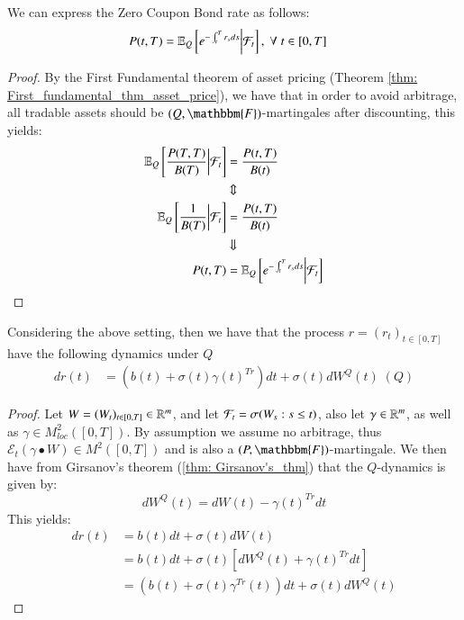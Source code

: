 \begin{result} 
We can express the Zero Coupon Bond rate as follows:
\begin{align*}
P(t,T) &= \mathbb{E}_{Q}\left[
e^{-\int_{t}^{T}r_{s}ds}\bigg{|}\mathcal{F}_{t}
\right], \;\forall \; t\in[0,T]
\end{align*}
\end{result}

\begin{proof}
By the First Fundamental theorem of asset pricing (Theorem \ref{thm: First_fundamental_thm_asset_price}), we have that in order to avoid arbitrage, all tradable assets should be $(Q, \mathbbm{F})$-martingales after discounting, this yields: 
\begin{align*}
\mathbb{E}_{Q}\left[
\frac{P(T,T)}{B(T)}
\bigg{|}\mathcal{F}_{t}
\right]
&= 
\frac{P(t,T)}{B(t)} \\ 
&\Updownarrow \\ 
\mathbb{E}_{Q}\left[
\frac{1}{B(T)}
\bigg{|}\mathcal{F}_{t}
\right]
&= \frac{P(t,T)}{B(t)} \\ 
&\Downarrow \\ 
P(t,T) &= \mathbb{E}_{Q}\left[
e^{-\int_{t}^{T}r_{s}ds}\bigg{|}\mathcal{F}_{t}
\right]
\end{align*}
\end{proof}


\newpage
\begin{proposition}
Considering the above setting, then we have that the process $r = (r_{t})_{t\in [0,T]}$ have the following dynamics under $Q$
\begin{align*}
dr(t) &= \left(b(t)+\sigma(t)\gamma(t)^{Tr}\right)dt 
+ \sigma(t)dW^{Q}(t) \;(Q)
\end{align*}
\end{proposition} 

\begin{proof}
Let $W = (W_{t})_{t \in [0,T]} \in \mathbb{R}^{m}$, and let $\mathcal{F}_{t} = \sigma(W_{s}:s\leq t)$, also let $\gamma \in \mathbb{R}^{m}$, as well as $\gamma \in M^{2}_{loc}([0,T])$. By assumption we assume no arbitrage, thus $\mathcal{E}_{t}(\gamma \bullet W) \in M^{2}([0,T])$ and is also a $(P, \mathbbm{F})$-martingale. We then have from Girsanov's theorem (\ref{thm: Girsanov's_thm}) that the $Q$-dynamics is given by:
$$
dW^{Q}(t) = dW(t) - \gamma(t)^{Tr}dt
$$
This yields: 
\begin{align*}
dr(t) &= b(t)dt + \sigma(t)dW(t) \\ 
&=  b(t)dt + \sigma(t)[dW^{Q}(t) + \gamma(t)^{Tr}dt] \\ 
&= \left(b(t) + \sigma(t)\gamma^{Tr}(t)\right)dt + \sigma(t)dW^{Q}(t)
\end{align*}


\end{proof}

